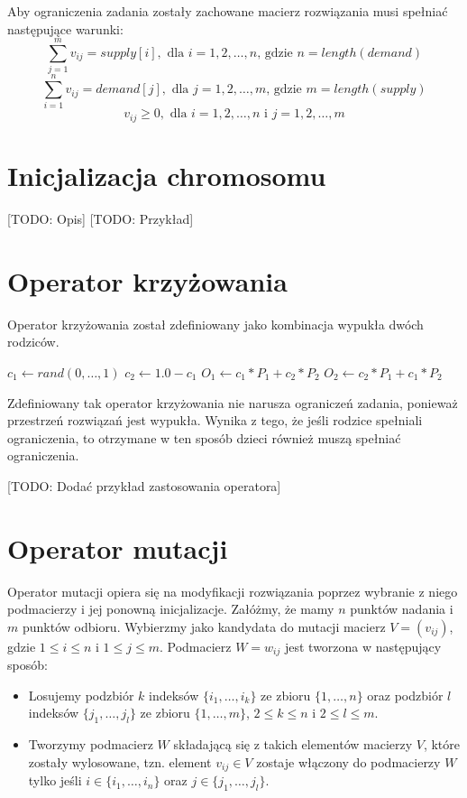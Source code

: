 Aby ograniczenia zadania zostały zachowane macierz rozwiązania musi spełniać następujące warunki:
$$\sum_{j=1}^{m} v_{ij} = supply[i], \text{ dla } i = 1, 2, \dots, n \text{, gdzie } n = length(demand)$$
$$\sum_{i=1}^{n} v_{ij} = demand[j], \text{ dla } j = 1, 2, \dots, m \text{, gdzie } m = length(supply)$$
$$v_{ij} \ge 0, \text{ dla } i = 1, 2, \dots, n \text{ i } j = 1, 2, \dots, m$$


\section{Inicjalizacja chromosomu}
[TODO: Opis]
[TODO: Przykład]


\section{Operator krzyżowania}
Operator krzyżowania został zdefiniowany jako kombinacja wypukła dwóch rodziców.

\begin{pseudokod}
    $c_1 \gets rand(0,\dots,1)$\;
    $c_2 \gets 1.0 - c_1$\;
    $O_1 \gets c_1 * P_1 + c_2 * P_2$\;
    $O_2 \gets c_2 * P_1 + c_1 * P_2$\;
    \;
\end{pseudokod}

Zdefiniowany tak operator krzyżowania nie narusza ograniczeń zadania, ponieważ przestrzeń rozwiązań jest wypukła. Wynika z tego, że jeśli 
rodzice spełniali ograniczenia, to otrzymane w ten sposób dzieci również muszą spełniać ograniczenia.

[TODO: Dodać przykład zastosowania operatora]

\section{Operator mutacji}
Operator mutacji opiera się na modyfikacji rozwiązania poprzez wybranie z niego podmacierzy i jej ponowną inicjalizacje. Załóżmy, że 
mamy $n$ punktów nadania i $m$ punktów odbioru. Wybierzmy jako kandydata do mutacji macierz $V = (v_{ij})$, gdzie $1 \le i \le n$ i 
$1 \le j \le m$. Podmacierz $W = w_{ij}$ jest tworzona w następujący sposób:

\begin{itemize}
    \item Losujemy podzbiór $k$ indeksów $\{i_1, \dots, i_k\}$ ze zbioru $\{1, \dots, n\}$ oraz podzbiór $l$ indeksów $\{j_1, \dots, j_l\}$ 
    ze zbioru $\{1, \dots, m\}$, $2 \le k \le n$ i $2 \le l \le m$.
    \item Tworzymy podmacierz $W$ składającą się z takich elementów macierzy $V$, które zostały wylosowane, tzn. element $v_{ij} \in V$ 
    zostaje włączony do podmacierzy $W$ tylko jeśli $i \in \{i_1, \dots, i_n\}$ oraz $j \in \{j_1, \dots, j_l\}$.
\end{itemize}

